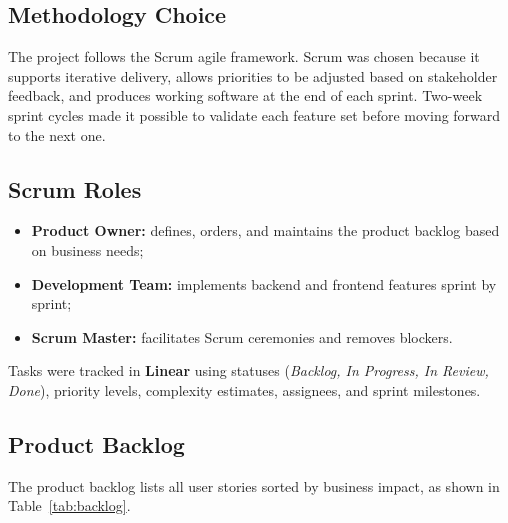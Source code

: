 \documentclass[12pt,a4paper]{report}
\begin{document}
\subsection{Methodology Choice}

The project follows the Scrum agile framework.
Scrum was chosen because it supports iterative delivery, allows priorities to be
adjusted based on stakeholder feedback, and produces working software at the end of
each sprint.
Two-week sprint cycles made it possible to validate each feature set before moving
forward to the next one.

\subsection{Scrum Roles}

\begin{itemize}
  \item \textbf{Product Owner:} defines, orders, and maintains the product backlog based on business needs;
  \item \textbf{Development Team:} implements backend and frontend features sprint by sprint;
  \item \textbf{Scrum Master:} facilitates Scrum ceremonies and removes blockers.
\end{itemize}

Tasks were tracked in \textbf{Linear} using statuses (\textit{Backlog, In Progress,
In Review, Done}), priority levels, complexity estimates, assignees, and sprint milestones.

\subsection{Product Backlog}

The product backlog lists all user stories sorted by business impact,
as shown in Table~\ref{tab:backlog}.
\end{document}
